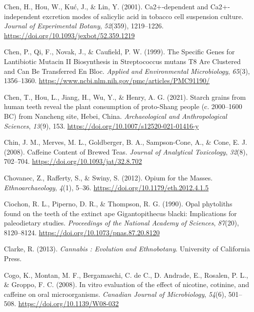 \documentclass[
  letterpaper,
]{book}
\newlength{\cslhangindent}
\newlength{\cslentryspacingunit} %
\newenvironment{CSLReferences}[2] %
 {%
  \setlength{\parindent}{0pt}
  \ifodd #1
  \let\oldpar\par
  \def\par{\hangindent=\cslhangindent\oldpar}
  \fi
  \setlength{\parskip}{#2\cslentryspacingunit}
 }%
 {}
\begin{document}
\begin{CSLReferences}{1}{0}
\leavevmode{}%
Chen, H., Hou, W., Kuć, J., \& Lin, Y. (2001). Ca2+‐dependent and
{Ca2}+‐independent excretion modes of salicylic acid in tobacco cell
suspension culture. \emph{Journal of Experimental Botany},
\emph{52}(359), 1219--1226.
\url{https://doi.org/10.1093/jexbot/52.359.1219}

\leavevmode{}%
Chen, P., Qi, F., Novak, J., \& Caufield, P. W. (1999). The {Specific
Genes} for {Lantibiotic Mutacin II Biosynthesis} in {Streptococcus}
mutans {T8 Are Clustered} and {Can Be} {Transferred En Bloc}.
\emph{Applied and Environmental Microbiology}, \emph{65}(3), 1356--1360.
\url{https://www.ncbi.nlm.nih.gov/pmc/articles/PMC91190/}

\leavevmode{}%
Chen, T., Hou, L., Jiang, H., Wu, Y., \& Henry, A. G. (2021). Starch
grains from human teeth reveal the plant consumption of proto-{Shang}
people (c. 2000--1600 {BC}) from {Nancheng} site, {Hebei}, {China}.
\emph{Archaeological and Anthropological Sciences}, \emph{13}(9), 153.
\url{https://doi.org/10.1007/s12520-021-01416-y}

\leavevmode{}%
Chin, J. M., Merves, M. L., Goldberger, B. A., Sampson-Cone, A., \&
Cone, E. J. (2008). Caffeine {Content} of {Brewed Teas}. \emph{Journal
of Analytical Toxicology}, \emph{32}(8), 702--704.
\url{https://doi.org/10.1093/jat/32.8.702}

\leavevmode{}%
Chovanec, Z., Rafferty, S., \& Swiny, S. (2012). Opium for the {Masses}.
\emph{Ethnoarchaeology}, \emph{4}(1), 5--36.
\url{https://doi.org/10.1179/eth.2012.4.1.5}

\leavevmode{}%
Ciochon, R. L., Piperno, D. R., \& Thompson, R. G. (1990). Opal
phytoliths found on the teeth of the extinct ape {Gigantopithecus}
blacki: Implications for paleodietary studies. \emph{Proceedings of the
National Academy of Sciences}, \emph{87}(20), 8120--8124.
\url{https://doi.org/10.1073/pnas.87.20.8120}

\leavevmode{}%
Clarke, R. (2013). \emph{Cannabis : {Evolution} and {Ethnobotany}}.
{University of California Press}.

\leavevmode{}%
Cogo, K., Montan, M. F., Bergamaschi, C. de C., D. Andrade, E., Rosalen,
P. L., \& Groppo, F. C. (2008). In vitro evaluation of the effect of
nicotine, cotinine, and caffeine on oral microorganisms. \emph{Canadian
Journal of Microbiology}, \emph{54}(6), 501--508.
\url{https://doi.org/10.1139/W08-032}


\end{CSLReferences}
\end{document}
